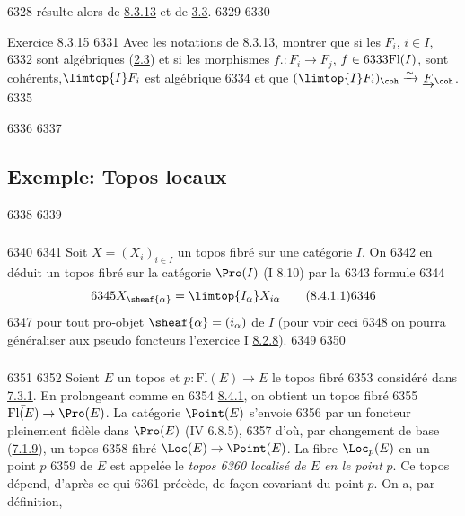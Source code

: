   6328	résulte alors de \hyperref[VI.thm8.3.13]{8.3.13} et de \hyperref[VI.cor3.3]{3.3}.
  6329	
  6330	\begin{enonce*}[remark]{Exercice 8.3.15}
  6331	Avec les notations de \hyperref[VI.thm8.3.13]{8.3.13}, montrer que si les $F_i$, $i \in I$,
  6332	sont algébriques (\hyperref[VI.def2.3]{2.3}) et si les morphismes $f. : F_i \to F_j$, $f \in
  6333	\text{\rm Fl}(I)$, sont  cohérents,\pageoriginale $\limtop{I} F_i$ est algébrique
  6334	et que $(\limtop{I} F_i)_{\coh} \xrightarrow{\sim} \underrightarrow{F}_{\coh}$.
  6335	\end{enonce*}
  6336	
  6337	\subsection{Exemple: Topos locaux}
  6338	
  6339	\subsubsection{}
  6340	
  6341	Soit $X = (X_i)_{i \in I}$ un topos fibré sur une catégorie $I$. On
  6342	en déduit un topos fibré sur la catégorie $\Pro(I)$ (I 8.10) par la
  6343	formule
  6344	\begin{equation*}
  6345	X_{\sheaf{\alpha}} = \limtop{I_{\alpha}} X_{i \alpha}\tag{8.4.1.1}
  6346	\end{equation*}
  6347	pour tout pro-objet $\sheaf{\alpha} = (i_{\alpha})$ de $I$ (pour voir ceci
  6348	on pourra généraliser aux pseudo foncteurs l'exercice I \hyperref[VI.subsubsec8.2.8]{8.2.8}).
  6349	
  6350	\subsubsection{}
  6351	
  6352	Soient $E$ un topos et $p : \text{Fl}(E) \to E$ le topos fibré
  6353	considéré dans \hyperref[VI.exem7.3.1]{7.3.1}. En prolongeant comme en
  6354	\hyperref[VI.subsubsec8.4.1]{8.4.1}, on obtient un topos fibré
  6355	$\bar{\text{Fl}(E)} \to \Pro(E)$. La catégorie $\Point(E)$ s'envoie
  6356	par un foncteur pleinement fidèle dans $\Pro(E)$ (IV 6.8.5),
  6357	d'où, par changement de base (\hyperref[VI.subsubsec7.1.9]{7.1.9}), un topos
  6358	fibré $\Loc(E) \to \Point(E)$. La fibre $\Loc_p(E)$ en un point $p$
  6359	de $E$ est appelée le \emph{topos
  6360	  localisé de $E$ en le point} $p$. Ce topos dépend, d'après ce qui
  6361	précède, de façon covariant du point $p$. On a, par définition,
